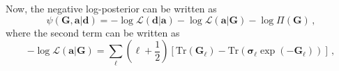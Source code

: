 
\qquad Now, the negative log-posterior can be written as
\begin{equation}
    \psi(\mathbf{G}, \mathbf{a}|\bm{d}) = - \log\mathcal{L}(\bm{d}|\bm{a}) - \log\mathcal{L}(\bm{a}|\bm{G}) - \log\Pi(\bm{G})\, , 
\end{equation}
where the second term can be written as
\begin{equation}
\label{Eq:LogPrAGl}
-\log\mathcal{L}(\mathbf{a}|\mathbf{G})=\sum_{\ell}\left( {\ell}+\frac{1}{2}\right) \left[\mathrm{Tr}(\mathbf{\mathbf{G}}_{\ell}) -\mathrm{Tr}\left(\boldsymbol{\sigma}_{\ell}\exp(-\mathbf{\mathbf{G}}_{\ell})
 \right) \right]\, ,
\end{equation}

